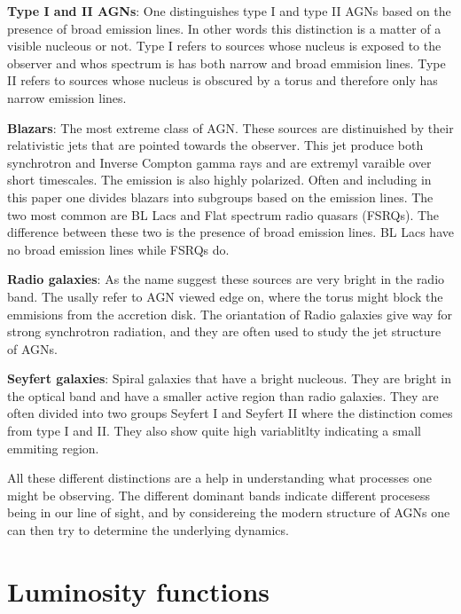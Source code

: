 \documentclass{article}
\begin{document}
\textbf{Type I and II AGNs}:
One distinguishes type I and type II AGNs based on the presence of broad emission lines. In other words this distinction is
a matter of a visible nucleous or not. Type I refers to sources whose nucleus is exposed to the observer and whos spectrum is 
has both narrow and broad emmision lines. Type II refers to sources whose nucleus is obscured by a torus and therefore only has narrow emission lines.

\textbf{Blazars}:
The most extreme class of AGN. These sources are distinuished by their relativistic jets that are pointed towards the observer. 
This jet produce both synchrotron and Inverse Compton gamma rays and are extremyl varaible over short timescales. The
emission is also highly polarized. Often and including in this paper one divides blazars into subgroups based on the 
emission lines. The two most common are BL Lacs and Flat spectrum radio quasars (FSRQs). The difference between these two is the
presence of broad emission lines. BL Lacs have no broad emission lines while FSRQs do.

\textbf{Radio galaxies}:
As the name suggest these sources are very bright in the radio band. The usally refer to AGN viewed edge on, where the
torus might block the emmisions from the accretion disk. The oriantation of Radio galaxies give way for strong 
synchrotron radiation, and they are often used to study the jet structure of AGNs.

\textbf{Seyfert galaxies}:
Spiral galaxies that have a bright nucleous. They are bright in the optical band and have a smaller active region 
than radio galaxies. They are often divided into two groups Seyfert I and Seyfert II where the distinction comes from type I and II. 
They also show quite high variablitlty indicating a small emmiting region. 



All these different distinctions are a help in understanding what processes one might be observing. The different
dominant bands indicate different procesess being in our line of sight, and by considereing the modern structure of 
AGNs one can then try to determine the underlying dynamics.  


\section{ Luminosity functions}
\end{document}
